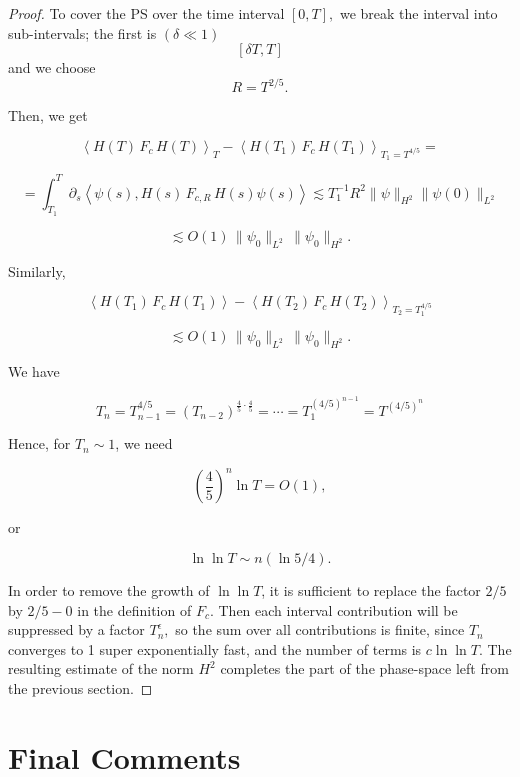 \documentclass[11pt]{article}
\begin{document}
\begin{proof}
To cover the PS over the time interval $[0,T],$
we break the interval into sub-intervals; the first is
$(\delta \ll 1)$
\[
[\delta T,T]
\]
and we choose
\[
R=T^{2/5}.
\]

Then, we get

\begin{equation}
\left<H(T)\, F_c\,H(T)\right>_{T}-\left<H(T_1)\,F_c\,H(T_1)\right>_{T_1=T^{4/5}}=
\end{equation}

\[
=\int_{T_1}^{T}\partial_s\left<\psi(s),H(s)\,F_{c,R}\,H(s)\psi(s)\right>\lesssim T_1^{-1}R^2\|\psi\|_{H^2}\|\psi(0)\|_{L^2}
\]

\[
\lesssim O(1)\,\|\psi_0\|_{L^2}\,\|\psi_0\|_{H^2}.\]

Similarly,

\begin{equation}
\left<H(T_1)\, F_c \,H(T_1)\right>-\left<H(T_2)\,F_c\,H(T_2)\right>_{T_2=T_1^{4/5}}
\end{equation}

\[
\lesssim
O(1)\,\|\psi_0\|_{L^2}\,\|\psi_0\|_{H^2}.
\]

We have

\begin{equation}
T_n
=
T_{n-1}^{4/5}
=
(T_{n-2})^{\frac45\cdot\frac45}
=
\cdots
=
T_1^{(4/5)^{n-1}}
=
T^{(4/5)^n}
\end{equation}

Hence, for $T_n\sim1$, we need

\begin{equation}
\left(\frac45\right)^n\ln T
=
O(1),
\end{equation}

or

\begin{equation}
\ln\ln T
\sim
n(\ln 5/4).
\end{equation}

In order to remove the growth of $\ln\ln T$, it is sufficient to replace the factor $2/5$ by $2/5-0$ in the definition of $F_c.$
Then each interval contribution will be suppressed by a factor $ T_n^{\epsilon}, $ so the sum over all contributions is finite, since $T_n$ converges to 1 super exponentially fast, and the number of terms is $c\ln\ln T.$
The resulting estimate of the norm $H^2$ completes the part of the phase-space left from the previous section.
\end{proof}

\section{ Final Comments}
\end{document}

